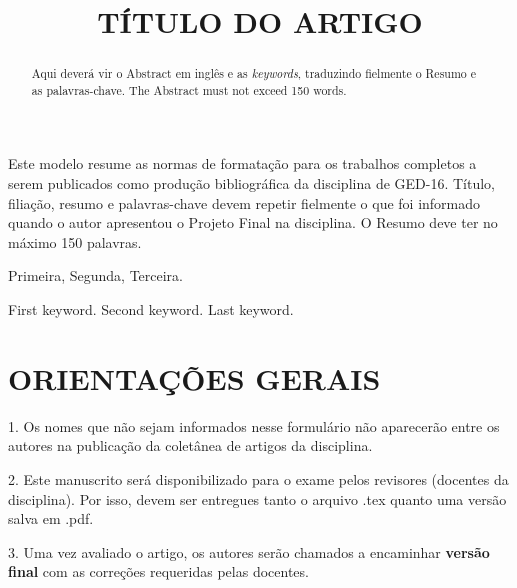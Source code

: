 \documentclass[a4paper,11pt]{article}
\title{TÍTULO DO ARTIGO}
\begin{document}
\maketitle

\author{
}

\author{
}

\vspace{8mm}
\begin{resumo}
Este modelo resume as normas de formatação para os trabalhos completos a serem publicados como produção bibliográfica da disciplina de GED-16. Título, filiação, resumo e palavras-chave devem repetir fielmente o que foi informado quando o autor apresentou o Projeto Final na disciplina.
O Resumo deve ter no máximo 150 palavras.
 \end{resumo}

\bigskip
\begin{palchaves}
Primeira, Segunda, Terceira.

\end{palchaves}


\vspace{8mm}

\begin{abstract}
Aqui deverá vir o Abstract em inglês
e as \textit{keywords}, traduzindo fielmente o Resumo e as palavras-chave.
The Abstract must not exceed 150 words.
\end{abstract}

\bigskip
\begin{keywords}
First keyword. Second keyword. Last keyword.

\end{keywords}


\newpage

\section*{ORIENTAÇÕES GERAIS}

1. Os nomes que não sejam informados nesse formulário não aparecerão entre os autores na publicação da coletânea de artigos da disciplina.


2. Este manuscrito será disponibilizado para o exame pelos revisores (docentes da disciplina). Por isso, devem ser entregues tanto o arquivo .tex quanto uma versão salva em .pdf.

3. Uma vez avaliado o artigo, os autores serão chamados a encaminhar \textbf{versão final} com as correções requeridas pelas docentes.
\end{document}
